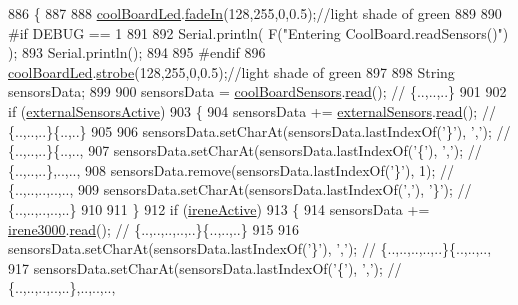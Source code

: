 \begin{DoxyCode}
886 \{
887 
888     \hyperlink{classCoolBoard_a1b1d3c684a5baa56b08486e192fd8e97}{coolBoardLed}.\hyperlink{classCoolBoardLed_ab778f5e7bed0ab74e3906d82110493c3}{fadeIn}(128,255,0,0.5);\textcolor{comment}{//light shade of green}
889                 
890 \textcolor{preprocessor}{#if DEBUG == 1}
891 
892     Serial.println( F(\textcolor{stringliteral}{"Entering CoolBoard.readSensors()"}) );
893     Serial.println();
894 
895 \textcolor{preprocessor}{#endif}
896     \hyperlink{classCoolBoard_a1b1d3c684a5baa56b08486e192fd8e97}{coolBoardLed}.\hyperlink{classCoolBoardLed_ad5f0de4c628cbfbf49896042831c64ad}{strobe}(128,255,0,0.5);\textcolor{comment}{//light shade of green}
897 
898     String sensorsData;
899 
900     sensorsData = \hyperlink{classCoolBoard_af102be5288bd7f7a8e59b13f86e26a00}{coolBoardSensors}.\hyperlink{classCoolBoardSensors_a91badb2539d91fda8679f2a597874c48}{read}(); \textcolor{comment}{// \{..,..,..\}}
901     
902     \textcolor{keywordflow}{if} (\hyperlink{classCoolBoard_a638b00b76aeb819ecfd4c10b8cdd7bb7}{externalSensorsActive})
903     \{
904         sensorsData += \hyperlink{classCoolBoard_a09e26264839c65873eb56af476eff6b2}{externalSensors}.\hyperlink{classExternalSensors_a53177b81eca3be89508b5511ddcd00fc}{read}(); \textcolor{comment}{// \{..,..,..\}\{..,..\}}
905 
906         sensorsData.setCharAt(sensorsData.lastIndexOf(\textcolor{charliteral}{'\}'}), \textcolor{charliteral}{','}); \textcolor{comment}{// \{..,..,..\}\{..,..,}
907         sensorsData.setCharAt(sensorsData.lastIndexOf(\textcolor{charliteral}{'\{'}), \textcolor{charliteral}{','}); \textcolor{comment}{// \{..,..,..\},..,..,}
908         sensorsData.remove(sensorsData.lastIndexOf(\textcolor{charliteral}{'\}'}), 1); \textcolor{comment}{// \{..,..,..,..,..,}
909         sensorsData.setCharAt(sensorsData.lastIndexOf(\textcolor{charliteral}{','}), \textcolor{charliteral}{'\}'}); \textcolor{comment}{// \{..,..,..,..,..\}}
910 
911     \}
912     \textcolor{keywordflow}{if} (\hyperlink{classCoolBoard_a9c3f7ac625481ee2ae802a25d97a4ae0}{ireneActive})
913     \{
914         sensorsData += \hyperlink{classCoolBoard_ad103718ce316006c4695b8eb312eaf11}{irene3000}.\hyperlink{classIrene3000_a852a170feea994ea1df01c6b245b5d9a}{read}(); \textcolor{comment}{// \{..,..,..,..,..\}\{..,..,..\}}
915 
916         sensorsData.setCharAt(sensorsData.lastIndexOf(\textcolor{charliteral}{'\}'}), \textcolor{charliteral}{','}); \textcolor{comment}{// \{..,..,..,..,..\}\{..,..,..,}
917         sensorsData.setCharAt(sensorsData.lastIndexOf(\textcolor{charliteral}{'\{'}), \textcolor{charliteral}{','}); \textcolor{comment}{// \{..,..,..,..,..\},..,..,..,}

\end{DoxyCode}
